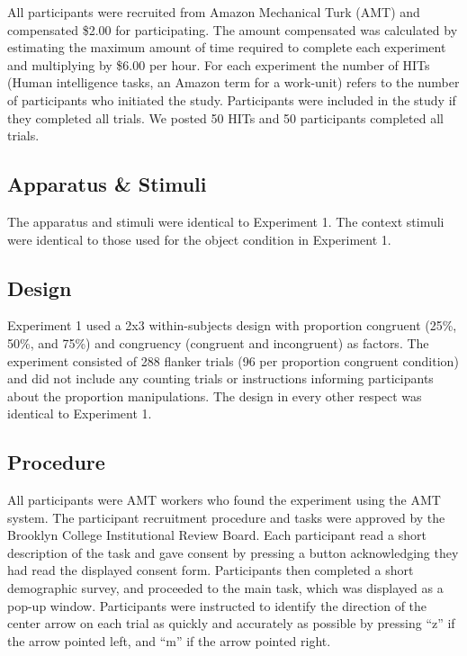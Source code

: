 \documentclass[english,,man,floatsintext]{apa6}
\begin{document}
All participants were recruited from Amazon Mechanical Turk (AMT) and compensated \$2.00 for participating. The amount compensated was calculated by estimating the maximum amount of time required to complete each experiment and multiplying by \$6.00 per hour. For each experiment the number of HITs (Human intelligence tasks, an Amazon term for a work-unit) refers to the number of participants who initiated the study. Participants were included in the study if they completed all trials. We posted 50 HITs and 50 participants completed all trials.

\hypertarget{apparatus-stimuli-2}{%
\subsection{Apparatus \& Stimuli}\label{apparatus-stimuli-2}}

The apparatus and stimuli were identical to Experiment 1. The context stimuli were identical to those used for the object condition in Experiment 1.

\hypertarget{design-2}{%
\subsection{Design}\label{design-2}}

Experiment 1 used a 2x3 within-subjects design with proportion congruent (25\%, 50\%, and 75\%) and congruency (congruent and incongruent) as factors. The experiment consisted of 288 flanker trials (96 per proportion congruent condition) and did not include any counting trials or instructions informing participants about the proportion manipulations. The design in every other respect was identical to Experiment 1.

\hypertarget{procedure-2}{%
\subsection{Procedure}\label{procedure-2}}

All participants were AMT workers who found the experiment using the AMT system. The participant recruitment procedure and tasks were approved by the Brooklyn College Institutional Review Board. Each participant read a short description of the task and gave consent by pressing a button acknowledging they had read the displayed consent form. Participants then completed a short demographic survey, and proceeded to the main task, which was displayed as a pop-up window. Participants were instructed to identify the direction of the center arrow on each trial as quickly and accurately as possible by pressing \enquote{z} if the arrow pointed left, and \enquote{m} if the arrow pointed right.
\end{document}
